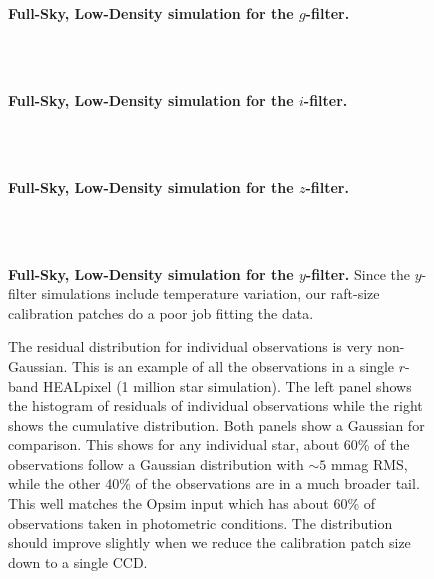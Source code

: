 \documentclass[12pt,preprint]{aastex}
\begin{document}
\begin{figure}
 \\
 \\
\caption{ {\bf Full-Sky, Low-Density simulation for the $g$-filter.}  \label{fig:g1e6}}
\end{figure}
 

\begin{figure}
 \\
 \\
\caption{ {\bf Full-Sky, Low-Density simulation for the $i$-filter.}  \label{fig:i1e6}}
\end{figure}

\begin{figure}
 \\
 \\
\caption{ {\bf Full-Sky, Low-Density simulation for the $z$-filter.}  \label{fig:z1e6}}
\end{figure}

\begin{figure}
 \\
 \\
\caption{ {\bf Full-Sky, Low-Density simulation for the $y$-filter.}  Since the $y$-filter simulations include temperature variation, our raft-size calibration patches do a poor job fitting the data.   \label{fig:y1e6}}
\end{figure}



\begin{figure}
\caption{The residual distribution for individual observations is very non-Gaussian.  This is an example of all the observations in a single $r$-band HEALpixel (1 million star simulation).  The left panel shows the histogram of residuals of individual observations while the right shows the cumulative distribution.  Both panels show a Gaussian for comparison.  This shows for any individual star, about 60\% of the observations follow a Gaussian distribution with $\sim5$ mmag RMS, while the other 40\% of the observations are in a much broader tail.  This well matches the Opsim input which has about 60\% of observations taken in photometric conditions.  The distribution should improve slightly when we reduce the calibration patch size down to a single CCD.  \label{fig:resid_dist}}
\end{figure}
\end{document}
